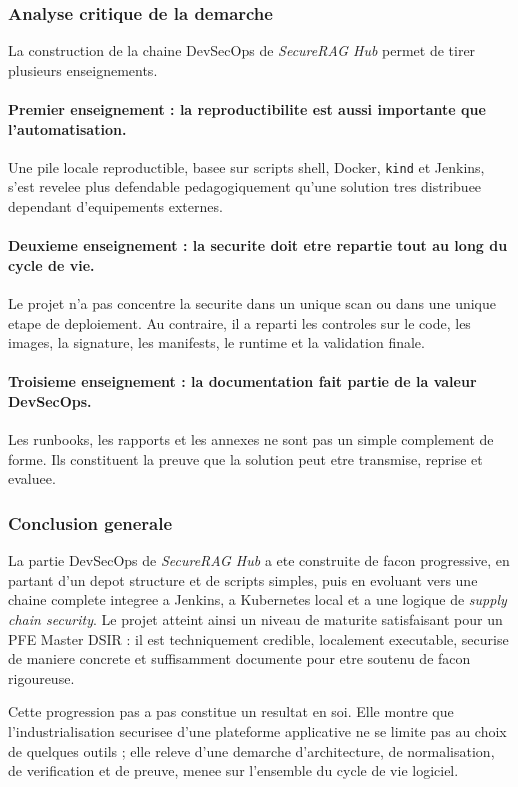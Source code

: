 \subsubsection{Analyse critique de la demarche}

La construction de la chaine DevSecOps de \textit{SecureRAG Hub} permet de tirer plusieurs enseignements.

\paragraph{Premier enseignement : la reproductibilite est aussi importante que l'automatisation.}
Une pile locale reproductible, basee sur scripts shell, Docker, \texttt{kind} et Jenkins, s'est revelee plus defendable pedagogiquement qu'une solution tres distribuee dependant d'equipements externes.

\paragraph{Deuxieme enseignement : la securite doit etre repartie tout au long du cycle de vie.}
Le projet n'a pas concentre la securite dans un unique scan ou dans une unique etape de deploiement. Au contraire, il a reparti les controles sur le code, les images, la signature, les manifests, le runtime et la validation finale.

\paragraph{Troisieme enseignement : la documentation fait partie de la valeur DevSecOps.}
Les runbooks, les rapports et les annexes ne sont pas un simple complement de forme. Ils constituent la preuve que la solution peut etre transmise, reprise et evaluee.

\subsubsection{Conclusion generale}

La partie DevSecOps de \textit{SecureRAG Hub} a ete construite de facon progressive, en partant d'un depot structure et de scripts simples, puis en evoluant vers une chaine complete integree a Jenkins, a Kubernetes local et a une logique de \textit{supply chain security}. Le projet atteint ainsi un niveau de maturite satisfaisant pour un PFE Master DSIR : il est techniquement credible, localement executable, securise de maniere concrete et suffisamment documente pour etre soutenu de facon rigoureuse.

Cette progression pas a pas constitue un resultat en soi. Elle montre que l'industrialisation securisee d'une plateforme applicative ne se limite pas au choix de quelques outils ; elle releve d'une demarche d'architecture, de normalisation, de verification et de preuve, menee sur l'ensemble du cycle de vie logiciel.
